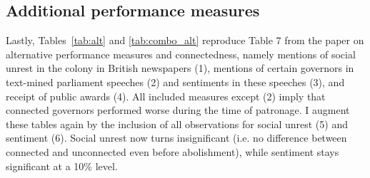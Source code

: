 \documentclass[a4paper]{article}\usepackage[]{graphicx}\usepackage[]{color}
\begin{document}
\subsection{Additional performance measures}
\hspace*{5mm} Lastly, Tables~\ref{tab:alt} and \ref{tab:combo_alt} reproduce Table 7 from the paper on alternative performance measures and connectedness, namely mentions of social unrest in the colony in British newspapers (1), mentions of certain governors in text-mined parliament speeches (2) and sentiments in these speeches (3), and receipt of public awards (4). All included measures except (2) imply that connected governors performed worse during the time of patronage. I augment these tables again by the inclusion of all observations for social unrest (5) and sentiment (6). Social unrest now turns insignificant (i.e. no difference between connected and unconnected even before abolishment), while sentiment stays significant at a 10\% level.
\end{document}

